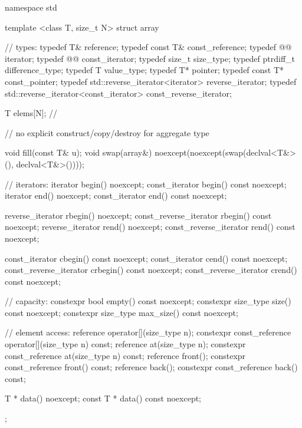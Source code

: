 \begin{codeblock}
namespace std {
  template <class T, size_t N>
  struct array {
    //  types:
    typedef T&                                    reference;
    typedef const T&                              const_reference;
    typedef @@                iterator;
    typedef @@                const_iterator;
    typedef size_t                                size_type;
    typedef ptrdiff_t                             difference_type;
    typedef T                                     value_type;
    typedef T*                                    pointer;
    typedef const T*                              const_pointer;
    typedef std::reverse_iterator<iterator>       reverse_iterator;
    typedef std::reverse_iterator<const_iterator> const_reverse_iterator;

    T       elems[N];           // \expos

    // no explicit construct/copy/destroy for aggregate type

    void fill(const T& u);
    void swap(array&) noexcept(noexcept(swap(declval<T&>(), declval<T&>())));

    // iterators:
    iterator               begin() noexcept;
    const_iterator         begin() const noexcept;
    iterator               end() noexcept;
    const_iterator         end() const noexcept;

    reverse_iterator       rbegin() noexcept;
    const_reverse_iterator rbegin() const noexcept;
    reverse_iterator       rend() noexcept;
    const_reverse_iterator rend() const noexcept;

    const_iterator         cbegin() const noexcept;
    const_iterator         cend() const noexcept;
    const_reverse_iterator crbegin() const noexcept;
    const_reverse_iterator crend() const noexcept;

    // capacity:
    constexpr bool      empty() const noexcept;
    constexpr size_type size() const noexcept;
    constexpr size_type max_size() const noexcept;

    // element access:
    reference                 operator[](size_type n);
    constexpr const_reference operator[](size_type n) const;
    reference                 at(size_type n);
    constexpr const_reference at(size_type n) const;
    reference                 front();
    constexpr const_reference front() const;
    reference                 back();
    constexpr const_reference back() const;

    T *       data() noexcept;
    const T * data() const noexcept;
  };
}
\end{codeblock}

